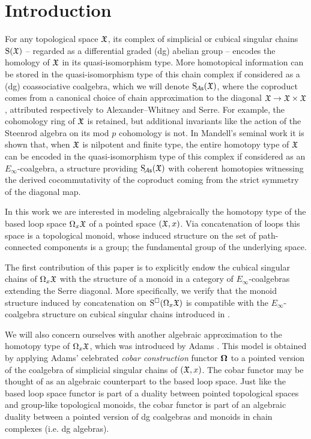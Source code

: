 
\section{Introduction}

For any topological space $\mathfrak{X}$, its complex of simplicial or cubical singular chains $\operatorname{S}(\mathfrak{X})$ -- regarded as a differential graded (dg) abelian group -- encodes the homology of $\mathfrak{X}$ in its quasi-isomorphism type.
More homotopical information can be stored in the quasi-isomorphism type of this chain complex if considered as a (dg) coassociative coalgebra, which we will denote $\operatorname{S_{\!{\mathcal{A}\mathsf{s}}}}(\mathfrak{X})$, where the coproduct comes from a canonical choice of chain approximation to the diagonal $\mathfrak{X} \to \mathfrak{X} \times \mathfrak{X}$, attributed respectively to Alexander--Whitney and Serre.
For example, the cohomology ring of $\mathfrak{X}$ is retained, but additional invariants like the action of the Steenrod algebra on its mod $p$ cohomology is not.
In Mandell's seminal work \cite{mandell2006homotopy_type} it is shown that, when $\mathfrak{X}$ is nilpotent and finite type, the entire homotopy type of $\mathfrak{X}$ can be encoded in the quasi-isomorphism type of this complex if considered as an $E_\infty$-coalgebra, a structure providing $\operatorname{S_{\!{\mathcal{A}\mathsf{s}}}}(\mathfrak{X})$ with coherent homotopies witnessing the derived cocommutativity of the coproduct coming from the strict symmetry of the diagonal map.

In this work we are interested in modeling algebraically the homotopy type of the based loop space $\Omega_x \mathfrak{X}$ of a pointed space $(\mathfrak{X}, x)$.
Via concatenation of loops this space is a topological monoid, whose induced structure on the set of path-connected components is a group; the fundamental group of the underlying space.

The first contribution of this paper is to explicitly endow the cubical singular chains of $\Omega_x \mathfrak{X}$ with the structure of a monoid in a category of $E_\infty$-coalgebras extending the Serre diagonal.
More specifically, we verify that the monoid structure induced by concatenation on $\operatorname{S^{\square}}(\Omega_x \mathfrak{X})$ is compatible with the $E_\infty$-coalgebra structure on cubical singular chains introduced in \cite{medina2022cube_einfty}.

We will also concern ourselves with another algebraic approximation to the homotopy type of $\Omega_x \mathfrak{X}$, which was introduced by Adams \cite{adams1956cobar}.
This model is obtained by applying Adams' celebrated \textit{cobar construction} functor $\operatorname{\mathbf{\Omega}}$ to a pointed version of the coalgebra of simplicial singular chains of $(\mathfrak{X}, x)$.
The cobar functor may be thought of as an algebraic counterpart to the based loop space.
Just like the based loop space functor is part of a duality between pointed topological spaces and group-like topological monoids, the cobar functor is part of an algebraic duality between a pointed version of dg coalgebras and monoids in chain complexes (i.e. dg algebras).

